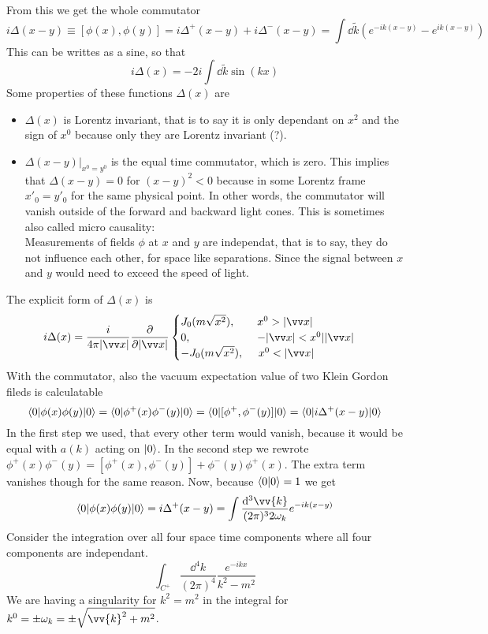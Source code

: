 From this we get the whole commutator
\[ i \Delta(x-y) \equiv [ \phi(x), \phi(y)] = i \Delta^+(x-y) + i \Delta^-(x-y) = \int \dd\tilde{k} \left( e^{-ik(x-y)} - e^{ik(x-y)}\right)\]
This can be writtes as a sine, so that
\[ i\Delta(x) = -2 i\int \dd\tilde{k} \sin\left( k x\right)\]
Some properties of these functions $\Delta(x)$ are
\begin{itemize}
\item $\Delta(x)$ is Lorentz invariant, that is to say it is only dependant on $x^2$ and the sign of $x^0$ because only they are Lorentz invariant (?).
\item $\Delta(x-y)|_{x^0 = y^0}$ is the equal time commutator, which is zero. This implies that $\Delta(x-y) = 0$ for $(x-y)^2 <0$ because in some Lorentz frame $x'_0 = y'_0$ for the same physical point. In other words, the commutator will vanish outside of the forward and backward light cones. This is sometimes also called micro causality:\\
Measurements of fields $\phi$ at $x$ and $y$ are independat, that is to say, they do not influence each other, for space like separations. Since the signal between $x$ and $y$ would need to exceed the speed of light.
\end{itemize}
The explicit form of $\Delta(x)$ is
\[ i \Delta(x) = \frac{i}{4 \pi | \vx|} \frac{\p}{\p | \vx|} \begin{cases}
J_0 (m \sqrt{x^2}), ~~~~~~ x^0 > |\vx|\\
0 ,~~~~~~~~~~~~~~~~~~ - | \vx| < x^0 | |\vx| \\
-J_0(m\sqrt{x^2}), ~~~~ x^0 < |\vx|
\end{cases}
\]
With the commutator, also the vacuum expectation value of two Klein Gordon fileds is calculatable
\[ \langle 0 | \phi(x) \phi(y) | 0 \rangle = \langle 0 | \phi^+(x) \phi^-(y) | 0 \rangle = \langle 0 | [\phi^+, \phi^-(y)] | 0\rangle = \langle 0 | i \Delta^+(x-y) | 0  \rangle \]
In the first step we used, that every other term would vanish, because it would be equal with $a(k)$ acting on $|0\rangle$. In the second step we rewrote $\phi^+(x) \phi^-(y) = [\phi^+(x), \phi^-(y)] + \phi^-(y)\phi^+(x)$. The extra term vanishes though for the same reason. Now, because $\langle 0 | 0 \rangle = 1$ we get
\[ \lk 0 | \phi(x) \phi(y) | 0 \rk = i \Delta^+ (x-y) = \int \frac{ \dd^3 \vv{k}}{(2\pi)^3 2 \omega_k} e^{-ik(x-y)}\]
Consider the integration over all four space time components where all four components are independant. 
\[ \int_{C^+} \frac{\dd^4 k}{(2\pi)^4} \frac{e^{-ikx}}{k^2-m^2}\]
We are having a singularity for $k^2 = m^2$ in the integral for $k^0 = \pm \omega_k = \pm \sqrt{\vv{k}^2 +m^2}$. 
